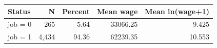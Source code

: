 \begin{tabular}{lrrrr}
\toprule
Status & N & Percent & Mean wage & Mean ln(wage+1) \\
\midrule
job = 0 & 265 & 5.64 & 33066.25 & 9.425 \\
job = 1 & 4,434 & 94.36 & 62239.35 & 10.553 \\
\bottomrule
\end{tabular}
